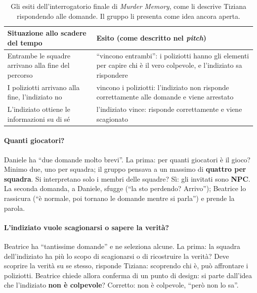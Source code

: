\begin{table}[htbp]
\centering
\small
\begin{tabular}{@{}p{5.6cm}p{7.4cm}@{}}
\toprule
\textbf{Situazione allo scadere del tempo} & \textbf{Esito (come descritto nel
\emph{pitch})} \\
\midrule
Entrambe le squadre arrivano alla fine del percorso & ``vincono entrambi'': i
poliziotti hanno gli elementi per capire chi è il vero colpevole, e l'indiziato sa
rispondere \\
I poliziotti arrivano alla fine, l'indiziato no & vincono i poliziotti: l'indiziato non
risponde correttamente alle domande e viene arrestato \\
L'indiziato ottiene le informazioni su di sé & l'indiziato vince: risponde correttamente
e viene scagionato \\
\bottomrule
\end{tabular}
\caption{Gli esiti dell'interrogatorio finale di \emph{Murder Memory}, come li descrive
Tiziana rispondendo alle domande. Il gruppo li presenta come idea ancora aperta.}
\label{a11:tab:esiti}
\end{table}

\paragraph{Quanti giocatori?} Daniele ha ``due domande molto brevi''. La prima: per
quanti giocatori è il gioco? Minimo due, uno per squadra; il gruppo pensava a un massimo
di \textbf{quattro per squadra}. Si interpretano solo i membri delle squadre? Sì: gli
invitati sono \textbf{NPC}. La seconda domanda, a Daniele, sfugge (``la sto perdendo?
Arrivo''); Beatrice lo rassicura (``è normale, poi tornano le domande mentre si
parla'') e prende la parola.

\paragraph{L'indiziato vuole scagionarsi o sapere la verità?} Beatrice ha ``tantissime
domande'' e ne seleziona alcune. La prima: la squadra dell'indiziato ha più lo scopo di
scagionarsi o di ricostruire la verità? Deve scoprire la verità su se stesso, risponde
Tiziana: scoprendo chi è, può affrontare i poliziotti. Beatrice chiede allora conferma
di un punto di design: si parte dall'idea che l'indiziato \textbf{non è colpevole}?
Corretto: non è colpevole, ``però non lo sa''.

